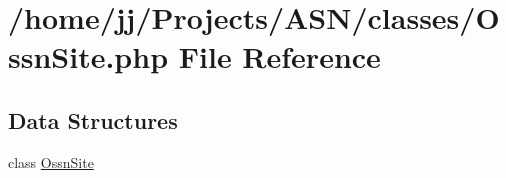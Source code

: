 \hypertarget{_ossn_site_8php}{}\section{/home/jj/\+Projects/\+A\+S\+N/classes/\+Ossn\+Site.php File Reference}
\label{_ossn_site_8php}
\subsection*{Data Structures}
\begin{DoxyCompactItemize}
\item 
class \hyperlink{class_ossn_site}{Ossn\+Site}
\end{DoxyCompactItemize}
